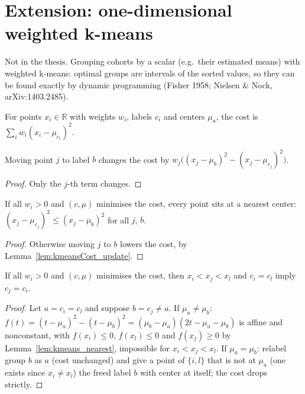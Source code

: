 \chapter{Extension: one-dimensional weighted k-means}\label{ch:kmeans}

Not in the thesis. Grouping cohorts by a scalar (e.g.\ their estimated
means) with weighted k-means: optimal groups are intervals of the sorted
values, so they can be found exactly by dynamic programming (Fisher 1958;
Nielsen \& Nock, arXiv:1403.2485).

\begin{definition}\label{def:kmeansCost}
  \leanok
  For points $x_i \in \mathbb{R}$ with weights $w_i$, labels $c_i$ and
  centers $\mu_a$, the cost is $\sum_i w_i (x_i - \mu_{c_i})^2$.
\end{definition}

\begin{lemma}\label{lem:kmeansCost_update}
  \leanok
  Moving point $j$ to label $b$ changes the cost by
  $w_j\bigl((x_j-\mu_b)^2 - (x_j-\mu_{c_j})^2\bigr)$.
\end{lemma}
\begin{proof}
  \leanok
  Only the $j$-th term changes.
\end{proof}

\begin{lemma}\label{lem:kmeans_nearest}
  \leanok
  If all $w_i > 0$ and $(c,\mu)$ minimises the cost, every point sits at a
  nearest center: $(x_j-\mu_{c_j})^2 \le (x_j-\mu_b)^2$ for all $j$, $b$.
\end{lemma}
\begin{proof}
  \leanok
  Otherwise moving $j$ to $b$ lowers the cost, by Lemma~\ref{lem:kmeansCost_update}.
\end{proof}

\begin{theorem}\label{thm:kmeans_contiguous}
  \leanok
  If all $w_i > 0$ and $(c,\mu)$ minimises the cost, then
  $x_i < x_j < x_l$ and $c_i = c_l$ imply $c_j = c_i$.
\end{theorem}
\begin{proof}
  \leanok
  Let $a = c_i = c_l$ and suppose $b = c_j \ne a$. If $\mu_a \ne \mu_b$:
  $f(t) = (t-\mu_a)^2 - (t-\mu_b)^2 = (\mu_b-\mu_a)(2t-\mu_a-\mu_b)$ is affine
  and nonconstant, with $f(x_i) \le 0$, $f(x_l) \le 0$ and $f(x_j) \ge 0$ by
  Lemma~\ref{lem:kmeans_nearest}, impossible for $x_i < x_j < x_l$. If
  $\mu_a = \mu_b$: relabel group $b$ as $a$ (cost unchanged) and give a point
  of $\{i,l\}$ that is not at $\mu_a$ (one exists since $x_i \ne x_l$) the
  freed label $b$ with center at itself; the cost drops strictly.
\end{proof}

